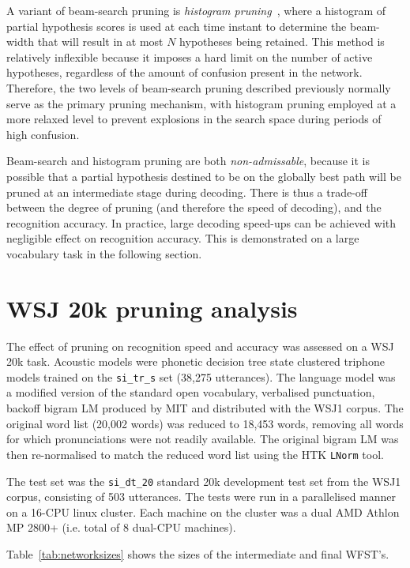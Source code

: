 \documentclass[a4paper,12pt]{report}
\begin{document}
A variant of beam-search pruning is \emph{histogram pruning}~\cite{steinbiss94improvements}, where a histogram of partial hypothesis scores is used at each time instant to determine the beam-width that will result in at most $N$ hypotheses being retained. This method is relatively inflexible because it imposes a hard limit on the number of active hypotheses, regardless of the amount of confusion present in the network. Therefore, the two levels of beam-search pruning described previously normally serve as the primary pruning mechanism, with histogram pruning employed at a more relaxed level to prevent explosions in the search space during periods of high confusion.

Beam-search and histogram pruning are both \emph{non-admissable}, because it is possible that a partial hypothesis destined to be on the globally best path will be pruned at an intermediate stage during decoding. There is thus a trade-off between the degree of pruning (and therefore the speed of decoding), and the recognition accuracy. In practice, large decoding speed-ups can be achieved with negligible effect on recognition accuracy. This is demonstrated on a large vocabulary task in the following section.

\section{WSJ 20k pruning analysis}

The effect of pruning on recognition speed and accuracy was assessed on a WSJ 20k task. Acoustic models were phonetic decision tree state clustered triphone models trained on the {\tt si\_tr\_s} set (38,275 utterances). The language model was a modified version of the standard open vocabulary, verbalised punctuation, backoff bigram LM produced by MIT and distributed with the WSJ1 corpus. The original word list (20,002 words) was reduced to 18,453 words, removing all words for which pronunciations were not readily available. The original bigram LM was then re-normalised to match the reduced word list using the HTK {\tt LNorm} tool.

The test set was the {\tt si\_dt\_20} standard 20k development test set from the WSJ1 corpus, consisting of 503 utterances. The tests were run in a parallelised manner on a 16-CPU linux cluster. Each machine on the cluster was a dual AMD Athlon MP 2800+ (i.e. total of 8 dual-CPU machines).

Table~\ref{tab:networksizes} shows the sizes of the intermediate and final WFST's.
\end{document}
